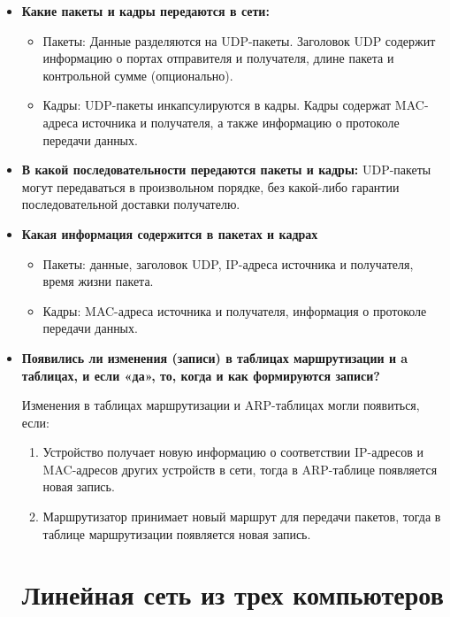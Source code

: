 \documentclass[12pt,onecolumn]{article}
\begin{document}
\begin{itemize}
  \item {
    \textbf{Какие пакеты и кадры передаются в сети:}
      \begin{itemize}
        \item Пакеты: Данные разделяются на UDP-пакеты. Заголовок UDP содержит информацию о портах отправителя и получателя, длине пакета и контрольной сумме (опционально).
        \item Кадры: UDP-пакеты инкапсулируются в кадры. Кадры содержат MAC-адреса источника и получателя, а также информацию о протоколе передачи данных.
      \end{itemize}
  }
  \item {
    \textbf{В какой последовательности передаются пакеты и кадры:}
    UDP-пакеты могут передаваться в произвольном порядке, без какой-либо гарантии последовательной доставки получателю.
  }
  \item {
    \textbf{Какая информация содержится в пакетах и кадрах}
    \begin{itemize}
      \item Пакеты: данные, заголовок UDP, IP-адреса источника и получателя, время жизни пакета.
      \item Кадры: MAC-адреса источника и получателя, информация о протоколе передачи данных.
    \end{itemize}
  }
  \item {
    \textbf{Появились ли изменения (записи) в таблицах маршрутизации и a таблицах, и если «да», то, когда и как формируются записи?}
      
      Изменения в таблицах маршрутизации и ARP-таблицах могли появиться, если:
      \begin{enumerate}
        \item Устройство получает новую информацию о соответствии IP-адресов и MAC-адресов других устройств в сети, тогда в ARP-таблице появляется новая запись.
        \item Маршрутизатор принимает новый маршрут для передачи пакетов, тогда в таблице маршрутизации появляется новая запись.
      \end{enumerate}
  }
\section{Линейная сеть из трех компьютеров}

\end{itemize}
\end{document}
